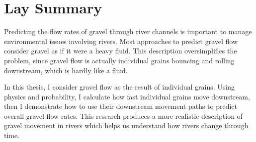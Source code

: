 

\chapter{Lay Summary}

Predicting the flow rates of gravel through river channels is important to manage environmental issues involving rivers.
Most approaches to predict gravel flow consider gravel as if it were a heavy fluid.
This description oversimplifies the problem, since gravel flow is actually individual grains bouncing and rolling downstream, which is hardly like a fluid.

In this thesis, I consider gravel flow as the result of individual grains. Using physics and probability, I calculate how fast individual grains move downstream, then I demonstrate how to use their downstream movement paths to predict overall gravel flow rates.
This research produces a more realistic description of gravel movement in rivers which helps us understand how rivers change through time.

\endinput
The lay or public summary explains the key goals and contributions of
the research\slash{}scholarly work in terms that can be understood by the
general public. It must not exceed 150 words in length.
